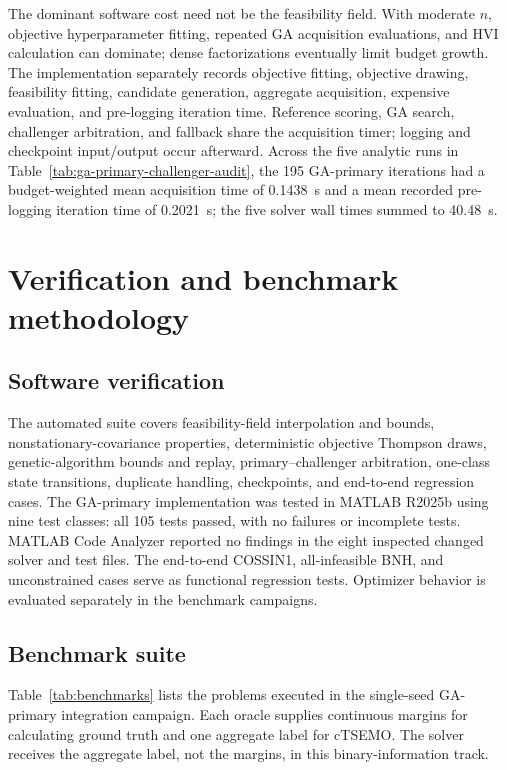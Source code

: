 \documentclass[twoside]{article}
\begin{document}
The dominant software cost need not be the feasibility field. With moderate
\(n\), objective hyperparameter fitting, repeated GA acquisition evaluations,
and HVI calculation can dominate; dense factorizations eventually limit
budget growth. The implementation separately records objective fitting,
objective drawing, feasibility fitting, candidate generation, aggregate
acquisition, expensive evaluation, and pre-logging iteration time. Reference
scoring, GA search, challenger arbitration, and fallback share the acquisition
timer; logging and checkpoint input/output occur afterward. Across the five
analytic runs in Table~\ref{tab:ga-primary-challenger-audit}, the 195
GA-primary iterations had a budget-weighted mean acquisition time of
0.1438~s and a mean recorded pre-logging iteration time of 0.2021~s; the five
solver wall times summed to 40.48~s.

\section{Verification and benchmark methodology}

\subsection{Software verification}

The automated suite covers feasibility-field interpolation and bounds,
nonstationary-covariance properties, deterministic objective Thompson draws,
genetic-algorithm bounds and replay, primary--challenger arbitration, one-class
state transitions, duplicate handling, checkpoints, and end-to-end regression
cases. The GA-primary implementation was tested in MATLAB R2025b using nine
test classes: all 105 tests passed, with no failures or incomplete tests.
MATLAB Code Analyzer reported no findings in the eight inspected changed
solver and test files. The end-to-end COSSIN1, all-infeasible BNH, and
unconstrained cases serve as functional regression tests. Optimizer behavior
is evaluated separately in the benchmark campaigns.

\subsection{Benchmark suite}

Table~\ref{tab:benchmarks} lists the problems executed in the
single-seed GA-primary integration campaign. Each oracle supplies continuous
margins for calculating ground truth and one aggregate label for cTSEMO.  The
solver receives the aggregate label, not the margins, in this
binary-information track.
\end{document}

